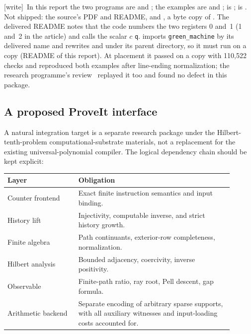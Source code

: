 \documentclass[11pt,letterpaper]{article}
\theoremstyle{definition}
\theoremstyle{remark}
\newcommand{\wtag}{\textup{[write]}}
\begin{document}
\wtag\ In this report the two programs are  and ; the examples are  and ;  is ;  is . Not shipped: the source's PDF and README, and , a byte copy of . The delivered README notes that the code numbers the two registers 0 and~1 (1 and~2 in the article) and calls the scalar $c$ \texttt{q}.  imports \texttt{green\_machine} by its delivered name and rewrites  and  under its parent directory, so it must run on a copy (README of this report). At placement it passed on a copy with 110,522 checks and reproduced both examples after line-ending normalization; the research programme's review~\cite{reviewCG} replayed it too and found no defect in this package.

\subsection{A proposed ProveIt interface}
A natural integration target is a separate research package under the
Hilbert-tenth-problem computational-substrate materials, not a replacement
for the existing universal-polynomial compiler. The logical dependency
chain should be kept explicit:
\begin{center}
\begin{tabular}{p{0.29\linewidth}p{0.61\linewidth}}
\toprule
Layer & Obligation\\
\midrule
Counter frontend & Exact finite instruction semantics and input binding.\\
History lift & Injectivity, computable inverse, and strict history growth.\\
Finite algebra & Path continuants, exterior-row completeness, normalization.\\
Hilbert analysis & Bounded adjacency, coercivity, inverse positivity.\\
Observable & Finite-path ratio, ray root, Pell descent, gap formula.\\
Arithmetic backend & Separate encoding of arbitrary sparse supports, with
all auxiliary witnesses and input-loading costs accounted for.\\
\bottomrule
\end{tabular}
\end{center}
\end{document}
